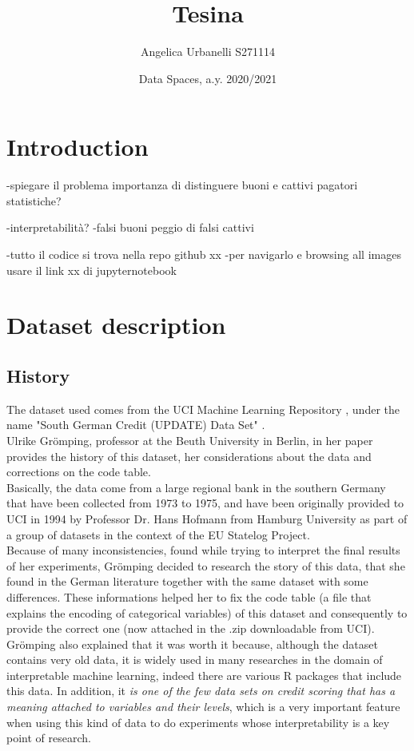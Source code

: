 \documentclass[letterpaper]{article}
\begin{document}
	\title{Tesina}
	\author{Angelica Urbanelli S271114}
	\date{Data Spaces, a.y. 2020/2021}
	\maketitle
	
	\tableofcontents
	
	\newpage 
	\section{Introduction}
	-spiegare il problema
	importanza di distinguere buoni e cattivi pagatori
	statistiche?
	
	-interpretabilità?
	-falsi buoni peggio di falsi cattivi
	
	
	-tutto il codice si trova nella repo github xx
	-per navigarlo e browsing all images usare il link xx di jupyternotebook
	
	\section{Dataset description}
	\subsection{History}
	The dataset used comes from the UCI Machine Learning Repository \cite{uci}, under the name "South German Credit (UPDATE) Data Set" \cite{dataset}. \\
	Ulrike Grömping, professor at the Beuth University in Berlin, in her paper \cite{gromping} provides the history of this dataset, her considerations about the data and corrections on the code table.\\
	Basically, the data come from a large regional bank in the southern Germany that have been collected from 1973 to 1975, and have been originally provided to UCI in 1994 by Professor Dr. Hans Hofmann from Hamburg University \cite{hofmann} as part of a group of datasets in the context of the EU Statelog Project.\\
	Because of many inconsistencies, found while trying to interpret the final results of her experiments, Grömping decided to research the story of this data, that she found in the German literature together with the same dataset with some differences. These informations helped her to fix the code table (a file that explains the encoding of categorical variables) of this dataset and consequently to provide the correct one (now attached in the .zip downloadable from UCI). \\ 
	Grömping also explained that it was worth it because, although the dataset contains very old data, it is widely used in many researches in the domain of interpretable machine learning, indeed there are various R packages that include this data. In addition, it \emph{is one of the few data sets on credit scoring that has a meaning attached to variables and their levels}, which is a very important feature when using this kind of data to do experiments whose interpretability is a key point of research.  \\
	
\end{document}
